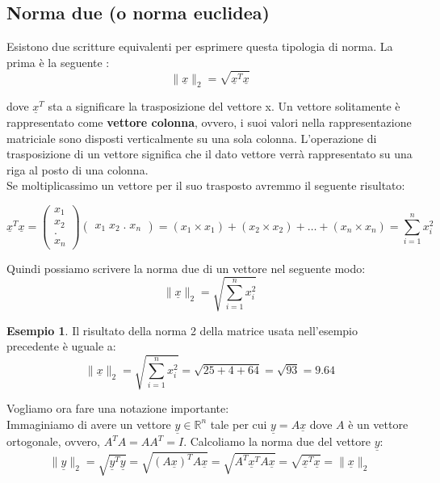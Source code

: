 \documentclass[12pt, a4paper]{book}
\theoremstyle{definition}
\newtheorem{exmp}{Esempio}[section]
\newcommand{\VarMtrx}[1]{\ensuremath{\underline{#1}}}
\begin{document}
\subsection{Norma due (o norma euclidea)}
\begin{flushleft}
Esistono due scritture equivalenti per esprimere questa tipologia di norma.  La prima è la seguente : 
\[ \lVert\VarMtrx{x}\rVert_{2} = \sqrt{\VarMtrx{x}^{T}\VarMtrx{x}} \]

dove $\VarMtrx{x}^{T}$ sta a significare la trasposizione del vettore x. 
Un vettore solitamente è rappresentato come \textbf{vettore colonna}, ovvero, i suoi valori nella rappresentazione matriciale sono disposti verticalmente su una  sola colonna. L'operazione di trasposizione di un vettore significa che il dato vettore verrà rappresentato su una riga al posto di una colonna. \\
\vspace{1em}
Se moltiplicassimo un vettore per il suo trasposto avremmo il seguente risultato: 

\[ 
	 \VarMtrx{x}^{T}\VarMtrx{x} = \begin{pmatrix} x_{1} \\ x_{2} \\ .\\ x_{n}  \end{pmatrix} \begin{pmatrix} x_{1} \; x_{2} \; . \; x_{n}  \end{pmatrix}  = 
	 (x_{1} \times x_{1}) + (x_{2} \times x_{2}) + \dots  + (x_{n} \times x_{n})
	 = \sum_{i=1}^{n} x_{i}^{2}
\]

Quindi possiamo scrivere la norma due di un vettore nel seguente modo: 
\[ \lVert\VarMtrx{x}\rVert_{2} = \sqrt{\sum_{i=1}^{n} x_{i}^{2}} \]

\begin{exmp}
Il risultato della norma 2 della matrice usata nell'esempio precedente è uguale a: 
\[ \lVert\VarMtrx{x}\rVert_{2}  = \sqrt{\sum_{i=1}^{n} x_{i}^{2}}  = \sqrt{25 + 4 + 64} = \sqrt{93} = 9.64 \]
\end{exmp}

Vogliamo ora fare una notazione importante:\\
Immaginiamo di avere un vettore $\VarMtrx{y} \in \mathbb{R}^{n}$ tale per cui $\VarMtrx{y} = A\VarMtrx{x}$ dove $A$ è un vettore ortogonale, ovvero,  $A^{T}A = AA^{T} = I$.
\vspace{1em}
Calcoliamo la norma due del vettore \VarMtrx{y}:
\[ \lVert\VarMtrx{y}\rVert_{2}  = \sqrt{\VarMtrx{y}^{T}\VarMtrx{y}} = \sqrt{(A\VarMtrx{x})^{T}A\VarMtrx{x}}  = \sqrt{A^{T}\VarMtrx{x}^{T}A\VarMtrx{x}} = \sqrt{\VarMtrx{x}^{T}\VarMtrx{x}} = \lVert\VarMtrx{x}\rVert_{2}\]
\end{flushleft}
\end{document}

